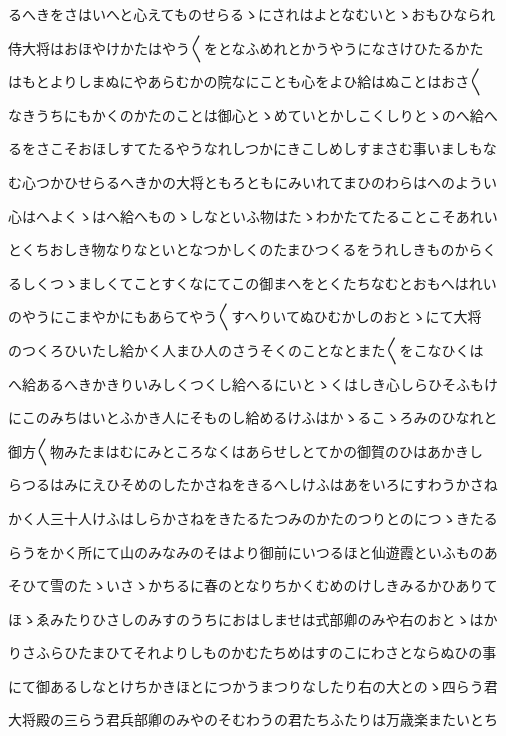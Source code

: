 \documentclass[a4paper,11pt,landscape]{ltjtarticle}
\begin{document}
るへきをさはいへと心えてものせらるゝにされはよとなむいとゝおもひなられ
\par\medskip
侍大将はおほやけかたはやう〱をとなふめれとかうやうになさけひたるかた
\par\medskip
はもとよりしまぬにやあらむかの院なにことも心をよひ給はぬことはおさ〱
\par\medskip
なきうちにもかくのかたのことは御心とゝめていとかしこくしりとゝのへ給へ
\par\medskip
るをさこそおほしすてたるやうなれしつかにきこしめしすまさむ事いましもな
\par\medskip
む心つかひせらるへきかの大将ともろともにみいれてまひのわらはへのようい
\par\medskip
心はへよくゝはへ給へものゝしなといふ物はたゝわかたてたることこそあれい
\par\medskip
とくちおしき物なりなといとなつかしくのたまひつくるをうれしきものからく
\par\medskip
るしくつゝましくてことすくなにてこの御まへをとくたちなむとおもへはれい
\par\medskip
のやうにこまやかにもあらてやう〱すへりいてぬひむかしのおとゝにて大将
\par\medskip
のつくろひいたし給かく人まひ人のさうそくのことなとまた〱をこなひくは
\par\medskip
へ給あるへきかきりいみしくつくし給へるにいとゝくはしき心しらひそふもけ
\par\medskip
にこのみちはいとふかき人にそものし給めるけふはかゝるこゝろみのひなれと
\par\medskip
御方〱物みたまはむにみところなくはあらせしとてかの御賀のひはあかきし
\par\medskip
らつるはみにえひそめのしたかさねをきるへしけふはあをいろにすわうかさね
\par\medskip
かく人三十人けふはしらかさねをきたるたつみのかたのつりとのにつゝきたる
\par\medskip
らうをかく所にて山のみなみのそはより御前にいつるほと仙遊霞といふものあ
\par\medskip
そひて雪のたゝいさゝかちるに春のとなりちかくむめのけしきみるかひありて
\par\medskip
ほゝゑみたりひさしのみすのうちにおはしませは式部卿のみや右のおとゝはか
\par\medskip
りさふらひたまひてそれよりしものかむたちめはすのこにわさとならぬひの事
\par\medskip
にて御あるしなとけちかきほとにつかうまつりなしたり右の大とのゝ四らう君
\par\medskip
大将殿の三らう君兵部卿のみやのそむわうの君たちふたりは万歳楽またいとち
\end{document}
